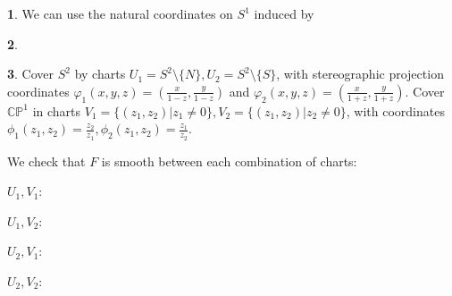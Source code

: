 \documentclass[10.5pt]{article}
\theoremstyle{definition}
\newtheorem{pb}{}
\newcommand{\set}[1]{\{#1\}}
\begin{document}
    \begin{pb}
        We can use the natural coordinates on \(S^1\) induced by
    \end{pb}
    \begin{pb}
        
    \end{pb}
    \begin{pb}
        Cover \(S^2\) by charts \(U_1 = S^2 \setminus \set{N}, U_2 = S^2 \setminus \set{S}\), with stereographic projection coordinates
        \(\varphi_1(x,y,z) = (\frac{x}{1-z},\frac{y}{1-z})\) and \(\varphi_2(x,y,z) = (\frac{x}{1+z},\frac{y}{1+z})\).
        Cover \(\mathbb{CP}^1\) in charts \(V_1 = \set{(z_1,z_2)\vert z_1 \neq 0}, V_2 = \set{(z_1,z_2)\vert z_2 \neq 0}\), with coordinates
        \(\phi_1(z_1,z_2) = \frac{z_2}{z_1}, \phi_2(z_1,z_2) = \frac{z_1}{z_2}\).

        We check that \(F\) is smooth between each combination of charts:
        
        \(U_1,V_1\):

        \(U_1,V_2\):

        \(U_2,V_1\):

        \(U_2,V_2\):
    \end{pb}
\end{document}
